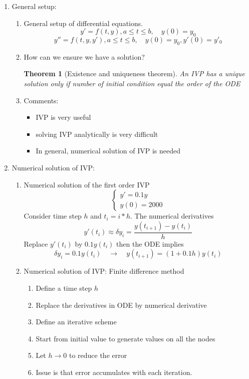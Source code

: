\documentclass{article}
\newtheorem{thm}{Theorem}[section]
\theoremstyle{remark}
\begin{document}
\begin{enumerate}
\item General setup:
\begin{enumerate}
\item General setup of differential equations.
\[
y' = f(t,y), a\leq t \leq b, \quad y(0)=y_0
\]
\[
y'' = f(t,y,y'), a\leq t \leq b, \quad y(0)=y_0, y'(0)=y'_0
\]
\item How can we ensure we have a solution?
\begin{thm}[Existence and uniqueness theorem]
An IVP has a unique solution only if number of initial condition equal the order of the ODE
\end{thm}
\item Comments:
\begin{itemize}
\item IVP is very useful
\item solving IVP analytically is very difficult
\item In general, numerical solution of IVP is needed
\end{itemize}
\end{enumerate}

\item Numerical solution of IVP: 
\begin{enumerate}
\item Numerical solution of the first order IVP
$$
\left\{\begin{array}{l}
y' = 0.1y\\
y(0) = 2000
\end{array}\right.
$$
Consider time step $h$ and $t_i = i*h$. The numerical derivatives 
$$
y'(t_i) \approx \delta y_i =  \frac{y(t_{i+1})-y(t_i)}{h}
$$
Replace $y'(t_i)$ by $0.1y(t_i)$ then the ODE implies
$$
\delta y_i= 0.1y(t_i)\quad \rightarrow \quad y(t_{i+1}) = (1+0.1h)y(t_i)
$$

\item Numerical solution of IVP: 
Finite difference method
\begin{enumerate}
\item Define a time step $h$
\item Replace the derivatives in ODE by numerical derivative
\item Define an iterative scheme
\item Start from initial value to generate values on all the nodes
\item Let $h\rightarrow 0$ to reduce the error 
\item Issue is that error accumulates with each iteration.
\end{enumerate}
\end{enumerate}


\end{enumerate}
\end{document}
